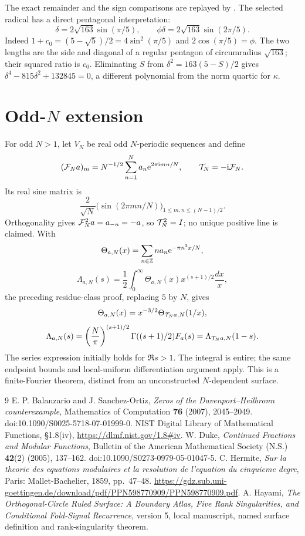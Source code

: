 \documentclass[11pt]{article}
\begin{document}
The exact remainder and the sign comparisons are replayed by
.
The selected radical has a direct pentagonal interpretation:
\[
\delta=2\sqrt{163}\sin(\pi/5),\qquad
\phi\delta=2\sqrt{163}\sin(2\pi/5).
\]
Indeed $1+c_0=(5-\sqrt5)/2=4\sin^2(\pi/5)$ and
$2\cos(\pi/5)=\phi$.  The two lengths are the side and diagonal
of a regular pentagon of circumradius $\sqrt{163}$; their squared ratio
is $c_0$.  Eliminating $S$ from $\delta^2=163(5-S)/2$ gives
$\delta^4-815\delta^2+132845=0$, a different polynomial from the
norm quartic for $\kappa$.

\section{Odd-\texorpdfstring{$N$}{N} extension}\label{oddN}
For odd $N>1$, let $V_N$ be real odd $N$-periodic sequences and define
\[
(\mathcal F_Na)_m=N^{-1/2}\sum_{n=1}^Na_n\mathrm e^{2\pi\mathrm i mn/N},\qquad
\mathcal T_N=-\mathrm i\mathcal F_N.
\]
Its real sine matrix is
\[
\frac2{\sqrt N}\bigl(\sin(2\pi mn/N)\bigr)_{1\le m,n\le(N-1)/2}.
\]
Orthogonality gives $\mathcal F_N^2a=a_{-n}=-a$, so $\mathcal T_N^2=I$; no unique
positive line is claimed.  With
\[
\Theta_{a,N}(x)=\sum_{n\in\mathbb Z}na_n\mathrm e^{-\pi n^2x/N},
\]\[
\Lambda_{a,N}(s)=\frac{1}{2}\int_0^\infty\Theta_{a,N}(x)x^{(s+1)/2}\frac{dx}{x},
\]
the preceding residue-class proof, replacing $5$ by $N$, gives
\[
\Theta_{a,N}(x)=x^{-3/2}\Theta_{\mathcal T_Na,N}(1/x),
\]\[
\Lambda_{a,N}(s)=\left(\frac{N}{\pi}\right)^{(s+1)/2}
\Gamma((s+1)/2)F_a(s)=\Lambda_{\mathcal T_Na,N}(1-s).
\]
The series expression initially holds for $\Re s>1$. The integral is entire;
the same endpoint bounds and local-uniform differentiation argument apply.
This is a finite-Fourier theorem, distinct from an unconstructed
$N$-dependent surface.

\begin{thebibliography}{9}
 E. P. Balanzario and J. Sanchez-Ortiz, \emph{Zeros of the Davenport--Heilbronn counterexample}, Mathematics of Computation \textbf{76} (2007), 2045--2049. doi:10.1090/S0025-5718-07-01999-0.
 NIST Digital Library of Mathematical Functions, \S1.8(iv), \url{https://dlmf.nist.gov/1.8#iv}.
 W. Duke, \emph{Continued Fractions and Modular Functions}, Bulletin of the American Mathematical Society (N.S.) \textbf{42}(2) (2005), 137--162. doi:10.1090/S0273-0979-05-01047-5.
 C. Hermite, \emph{Sur la theorie des equations modulaires et la resolution de l'equation du cinquieme degre}, Paris: Mallet-Bachelier, 1859, pp.~47--48. \url{https://gdz.sub.uni-goettingen.de/download/pdf/PPN598770909/PPN598770909.pdf}.
 A. Hayami, \emph{The Orthogonal-Circle Ruled Surface: A Boundary Atlas, Five Rank Singularities, and Conditional Fold-Signal Recurrence}, version 5, local manuscript, named surface definition and rank-singularity theorem.
\end{thebibliography}
\end{document}
